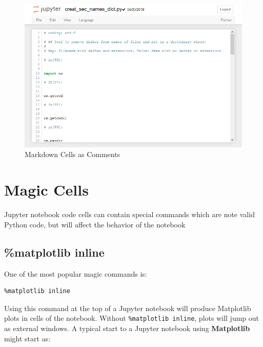 \documentclass{book}
\makeatletter
\def\maxwidth{\ifdim\Gin@nat@width>\linewidth\linewidth
    \else\Gin@nat@width\fi}
\let\Oldincludegraphics\includegraphics
\renewcommand{\includegraphics}[1]{\Oldincludegraphics[width=.8\maxwidth]{#1}}
\makeatother
\begin{document}
\begin{figure}
\centering
\includegraphics{images/jupyter_notebook_markdown_cells_as_comments.png}
\caption{Markdown Cells as Comments}
\end{figure}
    




    
        \section{Magic Cells}\label{magic-cells}
    




    
        Jupyter notebook code cells can contain special commands which are note
valid Python code, but will affect the behavior of the notebook
    




    
        \subsection{\%matplotlib inline}\label{matplotlib-inline}
    




    
        One of the most popular magic commands is:

\begin{lstlisting}
%matplotlib inline
\end{lstlisting}

Using this command at the top of a Jupyter notebook will produce
Matplotlib plots in cells of the notebook. Without
\lstinline!%matplotlib inline!, plots will jump out as external windows.
A typical start to a Jupyter notebook using \textbf{Matplotlib} might
start as:
\end{document}
